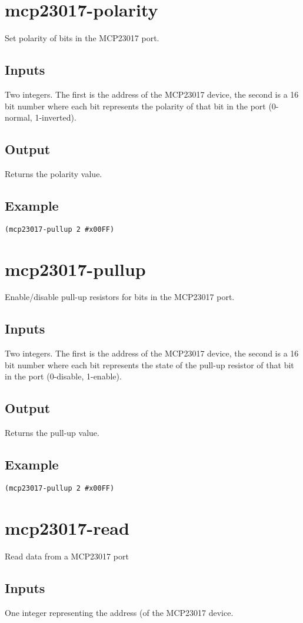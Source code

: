 \documentclass[10pt, openany]{book}
\begin{document}
\section{mcp23017-polarity}
Set polarity of bits in the MCP23017 port.
\subsection{Inputs}
Two integers.  The first is the address of the MCP23017 device, the second is a 16 bit number where each bit represents the polarity of that bit in the port (0-normal, 1-inverted).
\subsection{Output}
Returns the polarity value.
\subsection{Example}
\begin{lstlisting}
(mcp23017-pullup 2 #x00FF)
\end{lstlisting}

\section{mcp23017-pullup}
Enable/disable pull-up resistors for bits in the MCP23017 port.
\subsection{Inputs}
Two integers.  The first is the address of the MCP23017 device, the second is a 16 bit number where each bit represents the state of the pull-up resistor of that bit in the port (0-disable, 1-enable).
\subsection{Output}
Returns the pull-up value.
\subsection{Example}
\begin{lstlisting}
(mcp23017-pullup 2 #x00FF)
\end{lstlisting}

\section{mcp23017-read}
Read data from a MCP23017 port
\subsection{Inputs}
One integer representing the address (of the MCP23017 device.
\end{document}
